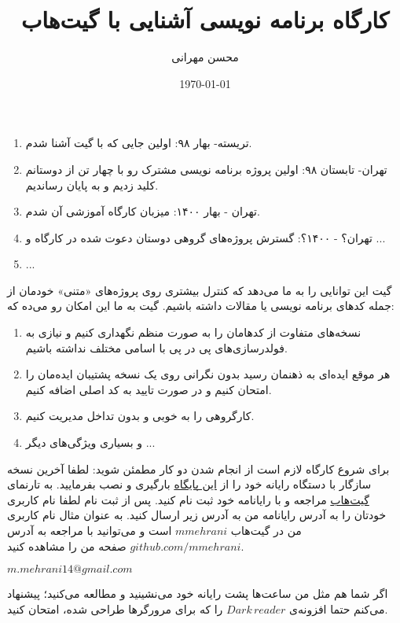 \documentclass[12pt,onecolumn,a4paper]{article}
\begin{document}
\title{کارگاه برنامه نویسی آشنایی با گیت‌هاب} 
\author{محسن مهرانی}
\date{\today}
\maketitle
{}

\begin{enumerate}[1.]
\item
تریسته- بهار ۹۸: اولین جایی که با گیت آشنا شدم.
\item
تهران- تابستان ۹۸: اولین پروژه برنامه نویسی مشترک رو با چهار تن از دوستانم کلید زدیم و به پایان رساندیم.
\item
تهران - بهار ۱۴۰۰: میزبان کارگاه آموزشی آن شدم.
\item
تهران؟ - ۱۴۰۰؟: گسترش پروژه‌های گروهی دوستان دعوت شده در کارگاه و ...
\item ...
\end{enumerate}

گیت این توانایی را به ما می‌دهد که کنترل بیشتری روی پروژه‌های «متنی» خودمان از جمله کدهای برنامه نویسی یا مقالات داشته باشیم. گیت به ما این امکان رو می‌ده که:
\begin{enumerate}
\item
نسخه‌های متفاوت از کدهامان را به صورت منظم نگهداری کنیم و نیازی به فولدرسازی‌های پی در پی با اسامی مختلف نداشته باشیم.
\item
هر موقع ایده‌ای به ذهنمان رسید بدون نگرانی روی یک نسخه پشتیبان ایده‌مان را امتحان کنیم و در صورت تایید به کد اصلی اضافه کنیم.
\item
کارگروهی را به خوبی و بدون تداخل مدیریت کنیم.
\item
و بسیاری ویژگی‌های دیگر ...
\end{enumerate}

برای شروع کارگاه لازم است از انجام شدن دو کار مطمئن شوید:
لطفا آخرین نسخه سازگار با دستگاه رایانه خود را از 
\href{https://git-scm.com/downloads}{این پایگاه}
بارگیری و نصب بفرمایید.
به تارنمای 
\href{https://github.com/}{گیت‌هاب}
 مراجعه و با رایانامه خود ثبت نام کنید. پس از ثبت نام لطفا نام کاربری خودتان را به آدرس رایانامه من به آدرس زیر ارسال کنید. به عنوان مثال نام کاربری من در گیت‌هاب $mmehrani$ است و می‌توانید با مراجعه به آدرس $github.com/mmehrani$ صفحه من را مشاهده کنید.\\
 \begin{flushleft}
 $m.mehrani14@gmail.com$
 \end{flushleft}
اگر شما هم مثل من ساعت‌ها پشت رایانه خود می‌نشینید و مطالعه می‌کنید؛ پیشنهاد می‌کنم حتما افزونه‌ی $Dark\, reader$ را که برای مرورگرها طراحی شده، امتحان کنید.
\end{document}
